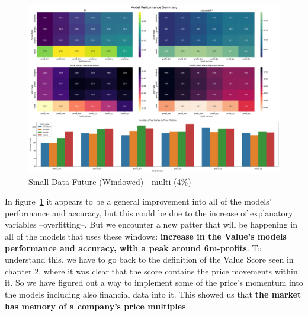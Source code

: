 \documentclass[11pt,english,a4paper,hidelinks]{book}
\begin{document}
\begin{figure}[H]
    \centering
    \includegraphics[width=1\textwidth]{images/code/models/linear_regression/third_model/Small Data future - Multi performance.png}
    \caption{Small Data Future (Windowed) - \acrshort{multi} (4\%)}
    \label{fig:third_linear_regression_summary}
\end{figure}

\noindent In figure~\ref{fig:third_linear_regression_summary} it appears to be a general improvement into all of the models' performance and accuracy, but this could be due to the increase of explanatory variables --overfitting--. But we encounter a new patter that will be happening in all of the models that uses these windows: \textbf{increase in the Value's models performance and accuracy, with a peak around 6m-profits}. To understand this, we have to go back to the definition of the Value Score seen in chapter 2, where it was clear that the score contains the price movements within it. So we have figured out a way to implement some of the price's momentum into the models including also financial data into it. This showed us that \textbf{the market has memory of a company's price multiples}.
\end{document}
